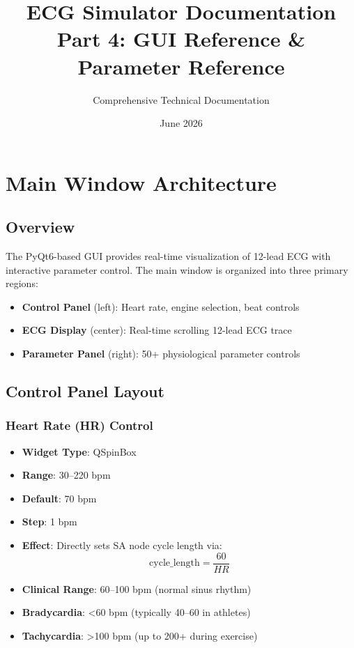 \documentclass[11pt, a4paper]{article}
\title{ECG Simulator Documentation\\Part 4: GUI Reference \& Parameter Reference}
\author{Comprehensive Technical Documentation}
\date{June 2026}
\begin{document}
\maketitle

\tableofcontents
\newpage

\section{Main Window Architecture}

\subsection{Overview}
The PyQt6-based GUI provides real-time visualization of 12-lead ECG with interactive parameter control. The main window is organized into three primary regions:

\begin{itemize}
    \item \textbf{Control Panel} (left): Heart rate, engine selection, beat controls
    \item \textbf{ECG Display} (center): Real-time scrolling 12-lead ECG trace
    \item \textbf{Parameter Panel} (right): 50+ physiological parameter controls
\end{itemize}

\subsection{Control Panel Layout}

\subsubsection{Heart Rate (HR) Control}
\begin{itemize}
    \item \textbf{Widget Type}: QSpinBox
    \item \textbf{Range}: 30--220 bpm
    \item \textbf{Default}: 70 bpm
    \item \textbf{Step}: 1 bpm
    \item \textbf{Effect}: Directly sets SA node cycle length via:
    \begin{equation}
        \text{cycle\_length} = \frac{60}{HR}
    \end{equation}
    \item \textbf{Clinical Range}: 60--100 bpm (normal sinus rhythm)
    \item \textbf{Bradycardia}: <60 bpm (typically 40--60 in athletes)
    \item \textbf{Tachycardia}: >100 bpm (up to 200+ during exercise)
\end{itemize}
\end{document}
